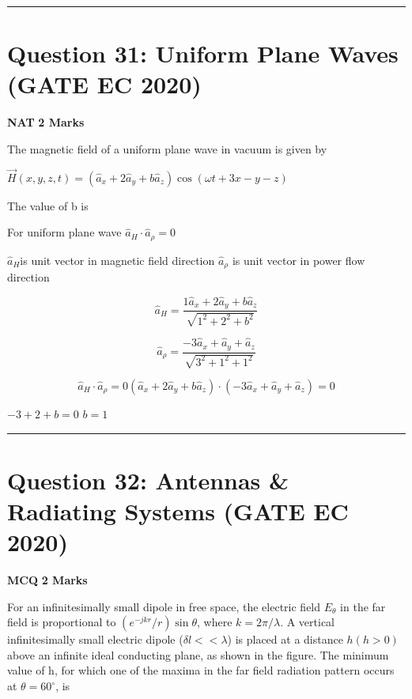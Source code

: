\documentclass[11pt,a4paper]{article}
\begin{document}
\vspace{1.5em}
\hrule
\vspace{1.5em}

\section*{Question 31: Uniform Plane Waves (GATE EC 2020)}
\noindent \textbf{\color{primary}NAT} \hfill \textbf{\color{secondary}2 Marks}


\noindent The magnetic field of a uniform plane wave in vacuum is given by 

$\vec{H}(x,y,z,t)=(\hat{a}_x+2\hat{a}_y+b\hat{a}_z) \cos (\omega t+3x-y-z)$

 The value of b is \underline{\hspace{1.5cm}}


\begin{tcolorbox}[solbox, title=Detailed Solution -- Question 31]
For uniform plane wave
$\hat{a}_{H}\cdot \hat{a}_{\rho }=0$

$\hat{a}_{H}$is unit vector in magnetic field direction $\hat{a}_{\rho }$ is unit vector in power flow direction

\[
\hat{a}_{H }=\frac{1\hat{a}_{x}+2\hat{a}_{y}+b\hat{a}_{z}}{\sqrt{1^{2}+2^{2}+b^{2}}}
\]

\[
\hat{a}_{\rho }=\frac{-3\hat{a}_{x}+\hat{a}_{y}+\hat{a}_{z}}{\sqrt{3^{2}+1^{2}+1^{2}}}
\]

\[
\hat{a}_{H}\cdot \hat{a}_{\rho }=0 (\hat{a}_{x}+2\hat{a}_{y}+b\hat{a}_{z})\cdot (-3\hat{a}_{x}+\hat{a}_{y}+\hat{a}_{z})=0
\]

$-3+2+b=0$
$b=1$
\end{tcolorbox}

\vspace{1.5em}
\hrule
\vspace{1.5em}

\section*{Question 32: Antennas \& Radiating Systems (GATE EC 2020)}
\noindent \textbf{\color{primary}MCQ} \hfill \textbf{\color{secondary}2 Marks}


\noindent For an infinitesimally small dipole in free space, the electric field $E_\theta$ in the far field
is proportional to $(e^{-jkr}/r) \sin \theta$, where $k = 2 \pi /\lambda$. A vertical infinitesimally small
electric dipole ($\delta l < < \lambda$) is placed at a distance $h(h > 0)$ above an infinite ideal
conducting plane, as shown in the figure. The minimum value of h, for which one
of the maxima in the far field radiation pattern occurs at $\theta =60^{\circ}$, is 
\end{document}
